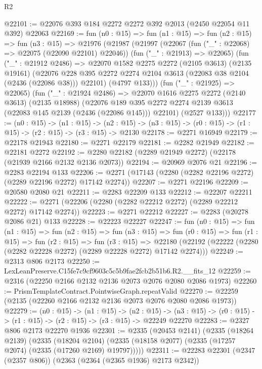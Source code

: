 \begin{lexlean}{R2}
\begin{coremodule}
@22101 := @22076 @393 @184 @2272 @2272 @392 @2013 (@2450 @22054 @11 @392) @22063
@22169 := fun (n0 : @15) =>
  fun (n1 : @15) =>
  fun (n2 : @15) =>
  fun (n3 : @15) =>
  @21976
    (@21987
      (@21997
        (@22067 (fun ("_" : @22068) => @22075 (@22090 @22101) @22046))
        (fun ("_" : @21913) => @22065)
        (fun ("_" : @21912 @2486) =>
        @22070
          @1582
          @2275
          @2272
          (@2105 @3613)
          (@2135 @19161)
          (@22076 @228 @395 @2272 @2274 @2104 @3613 (@22083 @38 @2104 (@2436 (@22086 @38))) @22101)
          (@4797 @133)))
      (fun ("_" : @21925) => @22065)
      (fun ("_" : @21924 @2486) =>
      @22070
        @1616
        @2275
        @2272
        (@2140 @3613)
        (@2135 @18988)
        (@22076 @189 @395 @2272 @2274 @2139 @3613 (@22083 @145 @2139 (@2436 (@22086 @145))) @22101)
        (@2527 @133)))
@22177 := (n0 : @15) ->
  (n1 : @15) ->
  (n2 : @15) -> (n3 : @15) -> (r0 : @15) -> (r1 : @15) -> (r2 : @15) -> (r3 : @15) -> @2130
@22178 := @2271 @16949
@22179 := @22178 @21943
@22180 := @2271 @22179
@22181 := @2282 @21949
@22182 := @22181 @2272
@22192 := @2280 @22182 (@2289 @21949 @2272) (@22178 (@21939 @2166 @2132 @2136 @2073))
@22194 := @20969 @2076 @21
@22196 := @2283 @22194 @133
@22206 := @2271 (@17143 (@2280 (@2282 @22196 @2272) (@2289 @22196 @2272) @17142 @2274))
@22207 := @2271 @22196
@22209 := @20580 @2080 @21
@22211 := @2283 @22209 @133
@22212 := @22207 @22211
@22222 := @2271 (@22206 (@2280 (@2282 @22212 @2272) (@2289 @22212 @2272) @17142 @2274))
@22223 := @2271 @22212
@22227 := @2283 (@20278 @2086 @21) @133
@22228 := @22223 @22227
@22247 := fun (n0 : @15) =>
  fun (n1 : @15) =>
  fun (n2 : @15) =>
  fun (n3 : @15) =>
  fun (r0 : @15) =>
  fun (r1 : @15) =>
  fun (r2 : @15) =>
  fun (r3 : @15) =>
  @22180 (@22192 (@22222 (@2280 (@2282 @22228 @2272) (@2289 @22228 @2272) @17142 @2274)))
@22249 := @2313 @806 @2173
@22250 := LexLeanPreserve.C15fe7c9cf9603c5c5b9fae2fcb2b51b6.R2.__fits_12
@22259 := @2316 (@22250 @2166 @2132 @2136 @2073 @2076 @2080 @2086 @1973)
@22260 := PrismTemplateContract.PointwiseGraph.repeatValid
@22270 := @22259 (@2135 (@22260 @2166 @2132 @2136 @2073 @2076 @2080 @2086 @1973))
@22279 := (n0 : @15) ->
  (n1 : @15) ->
  (n2 : @15) -> (n3 : @15) -> (r0 : @15) -> (r1 : @15) -> (r2 : @15) -> (r3 : @15) -> @22249 @22270
@22283 := @2327 @806 @2173 @22270 @1936
@22301 := @2335
    (@20453 @2141)
    (@2335
      (@18264 @2139)
      (@2335
        (@18204 @2104)
        (@2335 (@18158 @2077) (@2335 (@17257 @2074) (@2335 (@17260 @2169) @19797)))))
@22311 := @22283 @22301 (@2347 (@2357 @806)) (@2363 (@2364 (@2365 @1936) @2173 @2342))

\end{coremodule}
\end{lexlean}
